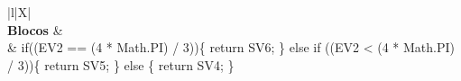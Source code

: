 \begin{xltabular}{\textwidth}{|l|X|}
		 \\ \hline
		\textbf{Blocos} &  \\ \hline
		 & if((EV2 == (4 * Math.PI) / 3))\{   return SV6; \} else if ((EV2 < (4 * Math.PI) / 3))\{   return SV5; \} else \{   return SV4; \} \\ \hline



\end{xltabular}
